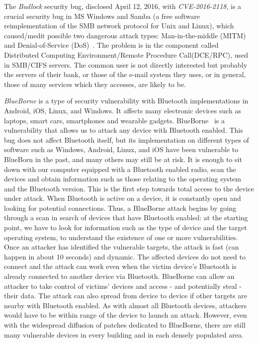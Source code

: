 \documentclass{masterthesis}
\begin{document}
The \emph{Badlock} security bug, disclosed April 12, 2016, with \textit{CVE-2016-2118}, is a crucial security bug in MS Windows and Samba (a free software reimplementation of the SMB network protocol for Unix and Linux), which caused/medit possible two dangerous attack types: Man-in-the-middle (MITM)~\cite{conti2016survey} and Denial-of-Service (DoS)~\cite{lau2000distributed}.
The problem is in the component called Distributed Computing Environment/Remote Procedure Call(DCE/RPC), used in SMB/CIFS servers.
The common user is not directly interested but probably the servers of their bank, or those of the e-mail system they uses, or in general, those of many services which they accesses, are likely to be.

\emph{BlueBorne} is a type of security vulnerability with Bluetooth implementations in Android, iOS, Linux, and Windows. It affects many electronic devices such as laptops, smart cars, smartphones and wearable gadgets.
BlueBorne~\cite{bour2018bluetooth} is a vulnerability that allows us to attack any device with Bluetooth enabled. This bug does not affect Bluetooth itself, but its implementation on different types of software such as Windows, Android, Linux, and iOS have been vulnerable to BlueBorn in the past, and many others may still be at risk.
It is enough to sit down with our computer equipped with a Bluetooth enabled radio, scan the devices and obtain information such as those relating to the operating system and the Bluetooth version. This is the first step towards total access to the device under attack.
When Bluetooth is active on a device, it is constantly open and looking for potential connections. Thus, a BlueBorne attack begins by going through a scan in search of devices that have Bluetooth enabled: at the starting point, we have to look for information such as the type of device and the target operating system, to understand the existence of one or more vulnerabilities. Once an attacker has identified the vulnerable targets, the attack is fast (can happen in about 10 seconds) and dynamic. The affected devices do not need to connect and the attack can work even when the victim device's Bluetooth is already connected to another device via Bluetooth.
BlueBorne can allow an attacker to take control of victims' devices and access - and potentially steal - their data. The attack can also spread from device to device if other targets are nearby with Bluetooth enabled. As with almost all Bluetooth devices, attackers would have to be within range of the device to launch an attack. However, even with the widespread diffusion of patches dedicated to BlueBorne, there are still many vulnerable devices in every building and in each densely populated area.
\end{document}
